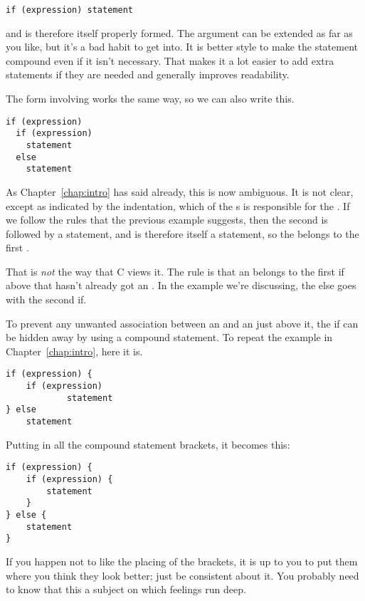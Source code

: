    \begin{Verbatim}
if (expression) statement
\end{Verbatim}

   and is therefore itself properly formed. The argument can be extended as
    far as you like, but it's a bad habit to get into. It is better style to
    make the statement compound even if it isn't necessary. That makes it a
    lot easier to add extra statements if they are needed and generally
    improves readability.


   The form involving \kelse{} works the same way, so we can also
    write this.


   \begin{Verbatim}
if (expression)
  if (expression)
    statement
  else
    statement
\end{Verbatim}

   As Chapter~\ref{chap:intro} has said already, this is now ambiguous. It is
    not clear, except as indicated by the indentation, which of the
    \kif{}s is responsible for the \kelse. If we follow
    the rules that the previous example suggests, then the second
    \kif{} is followed by a statement, and is therefore itself a
    statement, so the \kelse{} belongs to the first
    \kif.


   That is \textit{not} the way that C views it. The rule is that an
    \kelse{} belongs to the first if above that hasn't already got an
    \kelse. In the example we're discussing, the else goes with the
    second if.


   To prevent any unwanted association between an \kelse{} and an
    \kif{} just above it, the if can be hidden away by using a
    compound statement.
    To repeat the example in Chapter~\ref{chap:intro}, here it is.


   \begin{Verbatim}
if (expression) {
    if (expression)
            statement
} else
    statement
\end{Verbatim}

   Putting in all the compound statement brackets, it becomes this:


   \begin{Verbatim}
if (expression) {
    if (expression) {
        statement
    }
} else {
    statement
}
\end{Verbatim}

   If you happen not to like the placing of the brackets, it is up to you
    to put them where you think they look better; just be consistent about it.
    You probably need to know that this a subject on which feelings run
    deep.


